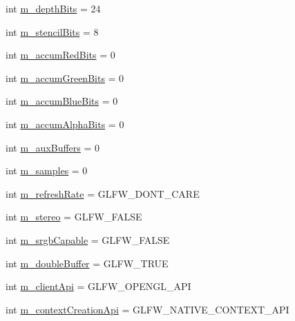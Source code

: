 \begin{DoxyCompactItemize}
\item 
int \mbox{\hyperlink{structec_1_1_window_creation_hints_ad7b8571c3da21ed1549fb4315a0f18d4}{m\+\_\+depth\+Bits}} = 24
\item 
int \mbox{\hyperlink{structec_1_1_window_creation_hints_a634dc1277b13e3f6f9357adbb483e8eb}{m\+\_\+stencil\+Bits}} = 8
\item 
int \mbox{\hyperlink{structec_1_1_window_creation_hints_a062467d06c359d4ae868c5c9ecbf2ccb}{m\+\_\+accum\+Red\+Bits}} = 0
\item 
int \mbox{\hyperlink{structec_1_1_window_creation_hints_ae708400790925cf17fcab2186940447d}{m\+\_\+accum\+Green\+Bits}} = 0
\item 
int \mbox{\hyperlink{structec_1_1_window_creation_hints_ae6939e4ae26c47c70e7c3d26fe882120}{m\+\_\+accum\+Blue\+Bits}} = 0
\item 
int \mbox{\hyperlink{structec_1_1_window_creation_hints_a41a825d31e2251b3ddcade624bc7eb20}{m\+\_\+accum\+Alpha\+Bits}} = 0
\item 
int \mbox{\hyperlink{structec_1_1_window_creation_hints_abe286fe11064c4dff0d078b7e5825f1e}{m\+\_\+aux\+Buffers}} = 0
\item 
int \mbox{\hyperlink{structec_1_1_window_creation_hints_ad6ebba67b73f17ee7b34c779988a8c00}{m\+\_\+samples}} = 0
\item 
int \mbox{\hyperlink{structec_1_1_window_creation_hints_ae03421b167b685961ace24c627d4d505}{m\+\_\+refresh\+Rate}} = G\+L\+F\+W\+\_\+\+D\+O\+N\+T\+\_\+\+C\+A\+RE
\item 
int \mbox{\hyperlink{structec_1_1_window_creation_hints_a729a2e0579e6344b78daa04f9ed34a9b}{m\+\_\+stereo}} = G\+L\+F\+W\+\_\+\+F\+A\+L\+SE
\item 
int \mbox{\hyperlink{structec_1_1_window_creation_hints_a2576a923073dc4699bd5378d3b273408}{m\+\_\+srgb\+Capable}} = G\+L\+F\+W\+\_\+\+F\+A\+L\+SE
\item 
int \mbox{\hyperlink{structec_1_1_window_creation_hints_a2ac2f95887ced649f6d6c92425c2c300}{m\+\_\+double\+Buffer}} = G\+L\+F\+W\+\_\+\+T\+R\+UE
\item 
int \mbox{\hyperlink{structec_1_1_window_creation_hints_a5af7038b95e4b6bd50f650bf67e5a2f8}{m\+\_\+client\+Api}} = G\+L\+F\+W\+\_\+\+O\+P\+E\+N\+G\+L\+\_\+\+A\+PI
\item 
int \mbox{\hyperlink{structec_1_1_window_creation_hints_aedfdcddc4cac629d6f1533551cd76559}{m\+\_\+context\+Creation\+Api}} = G\+L\+F\+W\+\_\+\+N\+A\+T\+I\+V\+E\+\_\+\+C\+O\+N\+T\+E\+X\+T\+\_\+\+A\+PI
\item 

\end{DoxyCompactItemize}
